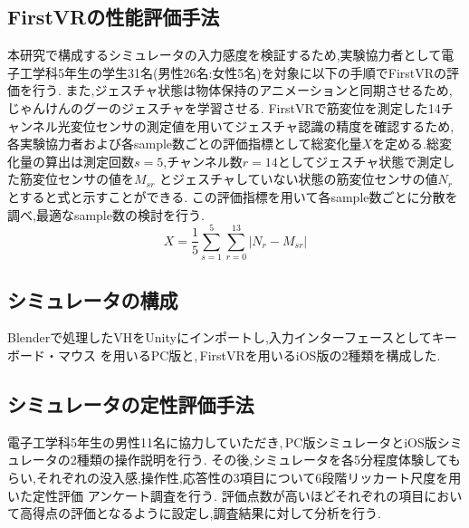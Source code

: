 \documentclass{ltjsarticle}
\begin{document}
	\subsection{FirstVRの性能評価手法}
		本研究で構成するシミュレータの入力感度を検証するため,実験協力者として電子工学科5年生の学生31名(男性26名:女性5名)を対象に以下の手順でFirstVRの評価を行う.
		また,ジェスチャ状態は物体保持のアニメーションと同期させるため,じゃんけんのグーのジェスチャを学習させる.
		FirstVRで筋変位を測定した14チャンネル光変位センサの測定値を用いてジェスチャ認識の精度を確認するため,
		各実験協力者および各sample数ごとの評価指標として総変化量$X$を定める.総変化量の算出は測定回数$s = 5$,チャンネル数$r = 14$としてジェスチャ状態で測定した筋変位センサの値を$M_{{s}{r}}$
		とジェスチャしていない状態の筋変位センサの値$N_{r}$とすると式と示すことができる.
		この評価指標を用いて各sample数ごとに分散を調べ,最適なsample数の検討を行う.
		\begin{equation}
			\label{eq:originaldata}
			X = \frac{1}{5} \sum_{s = 1}^{5} \sum_{r = 0}^{13} |N_{r} - M_{{s}{r}}|
		\end{equation}
		

	\subsection{シミュレータの構成}
		Blenderで処理したVHをUnityにインポートし,入力インターフェースとしてキーボード・マウス
		を用いるPC版と,\,FirstVRを用いるiOS版の2種類を構成した.
		
	\subsection{シミュレータの定性評価手法}
		電子工学科5年生の男性11名に協力していただき,\,PC版シミュレータとiOS版シミュレータの2種類の操作説明を行う.
		その後,シミュレータを各5分程度体験してもらい,それぞれの没入感,操作性,応答性の3項目について6段階リッカート尺度を用いた定性評価
		アンケート調査を行う.
		評価点数が高いほどそれぞれの項目において高得点の評価となるように設定し,調査結果に対して分析を行う.
\end{document}

